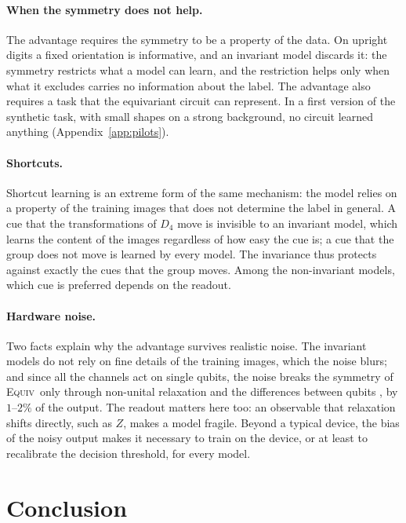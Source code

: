 \documentclass[aps,pra,reprint,superscriptaddress,longbibliography]{revtex4-2}
\newcommand{\Equiv}{\textsc{Equiv}}
\begin{document}
\paragraph{When the symmetry does not help.} The advantage requires the symmetry to be a property of the data. On upright digits a fixed orientation is informative, and an invariant model discards it: the symmetry restricts what a model can learn, and the restriction helps only when what it excludes carries no information about the label. The advantage also requires a task that the equivariant circuit can represent. In a first version of the synthetic task, with small shapes on a strong background, no circuit learned anything (Appendix~\ref{app:pilots}).

\paragraph{Shortcuts.} Shortcut learning \citep{geirhos2020shortcut,lapuschkin2019unmasking} is an extreme form of the same mechanism: the model relies on a property of the training images that does not determine the label in general. A cue that the transformations of $D_4$ move is invisible to an invariant model, which learns the content of the images regardless of how easy the cue is; a cue that the group does not move is learned by every model. The invariance thus protects against exactly the cues that the group moves. Among the non-invariant models, which cue is preferred depends on the readout.

\paragraph{Hardware noise.} Two facts explain why the advantage survives realistic noise. The invariant models do not rely on fine details of the training images, which the noise blurs; and since all the channels act on single qubits, the noise breaks the symmetry of \Equiv\ only through non-unital relaxation and the differences between qubits \citep{tuysuz2024symmetry}, by $1$--$2\%$ of the output. The readout matters here too: an observable that relaxation shifts directly, such as $Z$, makes a model fragile. Beyond a typical device, the bias of the noisy output makes it necessary to train on the device, or at least to recalibrate the decision threshold, for every model.

\section{Conclusion}\label{sec:conclusion}
\end{document}

